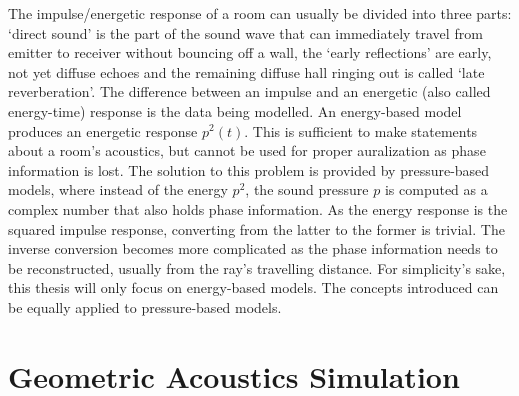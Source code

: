 The impulse/energetic response of a room can usually be divided into three parts:
`direct sound' is the part of the sound wave that can immediately travel from emitter to receiver without bouncing off a wall,
the `early reflections' are early, not yet diffuse echoes
and the remaining diffuse hall ringing out is called `late reverberation'.
\newline
The difference between an impulse and an energetic (also called energy-time) response is the data being modelled.
An energy-based model produces an energetic response \(p^2(t)\).
This is sufficient to make statements about a room's acoustics,
but cannot be used for proper auralization as phase information is lost.
The solution to this problem is provided by pressure-based models,
where instead of the energy \(p^2\),
the sound pressure \(p\) is computed as a complex number that also holds phase information.
\newline
As the energy response is the squared impulse response,
converting from the latter to the former is trivial.
The inverse conversion becomes more complicated as the phase information needs to be reconstructed,
usually from the ray's travelling distance.
\newline
For simplicity's sake, this thesis will only focus on energy-based models.
The concepts introduced can be equally applied to pressure-based models.

\section{Geometric Acoustics Simulation}\label{sec:FundamentalGA}

